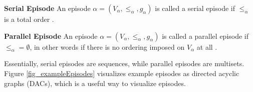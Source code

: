 \begin{mydef}
\textbf{Serial Episode} An episode $\alpha = (V_\alpha,{\leq}_{\alpha},g_\alpha)$ is called a serial episode if ${\leq}_{\alpha}$ is a total order \cite{mannila1995discovering}.
\end{mydef}

\begin{mydef}
\textbf{Parallel Episode} An episode $\alpha = (V_\alpha,{\leq}_{\alpha},g_\alpha)$ is called a parallel episode if ${\leq}_{\alpha} = \emptyset$, in other words if there is no ordering imposed on $V_\alpha$ at all \cite{mannila1995discovering}.
\end{mydef}

Essentially, serial episodes are sequences, while parallel episodes are multisets. Figure \ref{fig_exampleEpisodes} visualizes example episodes as directed acyclic graphs (DACs), which is a useful way to visualize episodes. 


